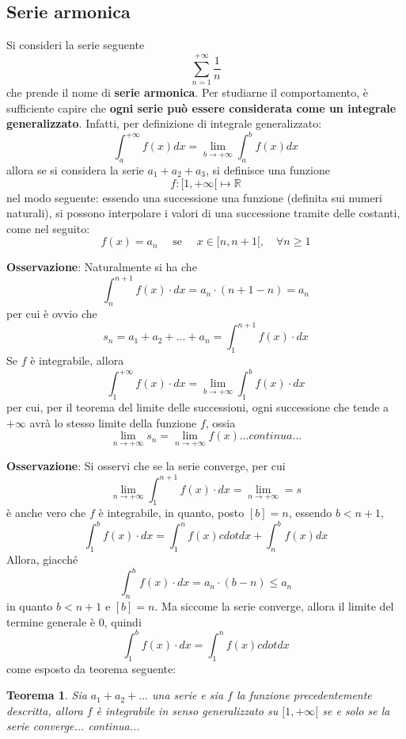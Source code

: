 \documentclass[a4paper]{extarticle}
\newtheorem{theorem}{Teorema}[section]
\begin{document}
\subsection{Serie armonica}
Si consideri la serie seguente
\[\sum_{n=1}^{+\infty} \frac{1}{n}\]
che prende il nome di \textbf{serie armonica}. Per studiarne il comportamento, è sufficiente capire che \textbf{ogni serie può essere considerata come un integrale generalizzato}. Infatti, per definizione di integrale generalizzato:
\[\int_a^{+\infty} f(x) dx = \lim_{b \to +\infty} \int_a^b f(x) dx\]
allora se si considera la serie $a_1+a_2+a_3$, si definisce una funzione
\[f : [1,+\infty[ \longmapsto \mathbb{R}\]
nel modo seguente: essendo una successione una funzione (definita sui numeri naturali), si possono interpolare i valori di una successione tramite delle costanti, come nel seguito:
\[f(x)=a_n \hspace{1em} \text{ se } \hspace{1em} x \in [n,n+1[, \hspace{1em} \forall n \geq 1\]

\vspace{1em}
\noindent
\textbf{Osservazione}: Naturalmente si ha che
\[\int_{n}^{n+1} f(x) \cdot dx = a_n \cdot (n+1-n) = a_n\]
per cui è ovvio che
\[s_n=a_1+a_2+...+a_n=\int_1^{n+1} f(x) \cdot dx\]
Se $f$ è integrabile, allora
\[\int_1^{+\infty} f(x) \cdot dx = \lim_{b \to +\infty} \int_1^b f(x) \cdot dx\]
per cui, per il teorema del limite delle successioni, ogni successione che tende a $+\infty$ avrà lo stesso limite della funzione $f$, ossia
\[\lim_{n \to +\infty} s_n = \lim_{n \to +\infty} f(x) ...continua...\]

\vspace{1em}
\noindent
\textbf{Osservazione}: Si osservi che se la serie converge, per cui
\[\lim_{n \to +\infty} \int_1^{n+1} f(x) \cdot dx = \lim_{n \to +\infty} = s\]
è anche vero che $f$ è integrabile, in quanto, posto $[b]=n$, essendo $b < n+1$,
\[\int_1^b f(x) \cdot dx = \int_1^n f(x) cdot dx + \int_n^b f(x) dx\]
Allora, giacché
\[\int_n^b f(x) \cdot dx = a_n \cdot (b-n) \leq a_n\]
in quanto $b<n+1$ e $[b]=n$. Ma siccome la serie converge, allora il limite del termine generale è $0$, quindi
\[\int_1^b f(x) \cdot dx = \int_1^n f(x) cdot dx\]
come esposto da teorema seguente:

\vspace{1em}
\noindent
\begin{theorem}
    Sia $a_1+a_2+...$ una serie e sia $f$ la funzione precedentemente descritta, allora $f$ è integrabile in senso generalizzato su $[1,+\infty[$ se e solo se la serie converge... continua...
\end{theorem}
\end{document}
